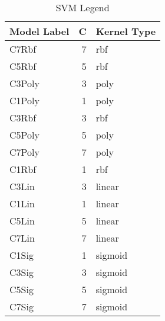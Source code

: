 \begin{table}
\centering
\caption{SVM Legend}
\label{tab:SVM_legend}
\begin{tabular}{lrl}
\toprule
Model Label & C & Kernel Type \\
\midrule
C7Rbf & 7 & rbf \\
C5Rbf & 5 & rbf \\
C3Poly & 3 & poly \\
C1Poly & 1 & poly \\
C3Rbf & 3 & rbf \\
C5Poly & 5 & poly \\
C7Poly & 7 & poly \\
C1Rbf & 1 & rbf \\
C3Lin & 3 & linear \\
C1Lin & 1 & linear \\
C5Lin & 5 & linear \\
C7Lin & 7 & linear \\
C1Sig & 1 & sigmoid \\
C3Sig & 3 & sigmoid \\
C5Sig & 5 & sigmoid \\
C7Sig & 7 & sigmoid \\
\bottomrule
\end{tabular}
\end{table}
